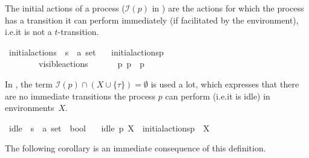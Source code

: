 \begin{isabellebody}
\begin{isamarkuptext}%
The initial actions of a process ($\mathcal{I}(p)$ in \cite{rbs}) are the actions for which the process has a transition it can perform immediately (if facilitated by the environment), i.e.\@ it is not a $t$-transition.%
\end{isamarkuptext}\isamarkuptrue%
\isamarkupfalse%
\ initial{\isacharunderscore}{\kern0pt}actions\ {\isacharcolon}{\kern0pt}{\isacharcolon}{\kern0pt}\ {\isacartoucheopen}{\isacharprime}{\kern0pt}s\ {\isasymRightarrow}\ {\isacharprime}{\kern0pt}a\ set{\isacartoucheclose}\isanewline
\ \ \ {\isacartoucheopen}initial{\isacharunderscore}{\kern0pt}actions{\isacharparenleft}{\kern0pt}p{\isacharparenright}{\kern0pt}\ \isanewline
\ \ \ \ {\isasymequiv}\ {\isacharbraceleft}{\kern0pt}{\isasymalpha}{\isachardot}{\kern0pt}\ {\isacharparenleft}{\kern0pt}{\isasymalpha}\ {\isasymin}\ visible{\isacharunderscore}{\kern0pt}actions\ {\isasymor}\ {\isasymalpha}\ {\isacharequal}{\kern0pt}\ {\isasymtau}{\isacharparenright}{\kern0pt}\ {\isasymand}\ {\isacharparenleft}{\kern0pt}{\isasymexists}\ p{\isacharprime}{\kern0pt}{\isachardot}{\kern0pt}\ p\ {\isasymlongmapsto}{\isasymalpha}\ p{\isacharprime}{\kern0pt}{\isacharparenright}{\kern0pt}{\isacharbraceright}{\kern0pt}{\isacartoucheclose}%
\begin{isamarkuptext}%
In \cite{rbs}, the term $\mathcal{I}(p) \cap (X \cup \{\tau\}) = \emptyset$ is used a lot, which expresses that there are no immediate transitions the process $p$ can perform (i.e.\@ it is idle) in environments~$X$.%
\end{isamarkuptext}\isamarkuptrue%
\isamarkupfalse%
\ idle\ {\isacharcolon}{\kern0pt}{\isacharcolon}{\kern0pt}\ {\isacartoucheopen}{\isacharprime}{\kern0pt}s\ {\isasymRightarrow}\ {\isacharprime}{\kern0pt}a\ set\ {\isasymRightarrow}\ bool{\isacartoucheclose}\isanewline
\ \ \ {\isacartoucheopen}idle\ p\ X\ {\isasymequiv}\ initial{\isacharunderscore}{\kern0pt}actions{\isacharparenleft}{\kern0pt}p{\isacharparenright}{\kern0pt}\ {\isasyminter}\ {\isacharparenleft}{\kern0pt}X{\isasymunion}{\isacharbraceleft}{\kern0pt}{\isasymtau}{\isacharbraceright}{\kern0pt}{\isacharparenright}{\kern0pt}\ {\isacharequal}{\kern0pt}\ {\isasymemptyset}{\isacartoucheclose}%
\begin{isamarkuptext}%
\pagebreak
The following corollary is an immediate consequence of this definition.%
\end{isamarkuptext}\isamarkuptrue%
\isamarkupfalse%

\end{isabellebody}
